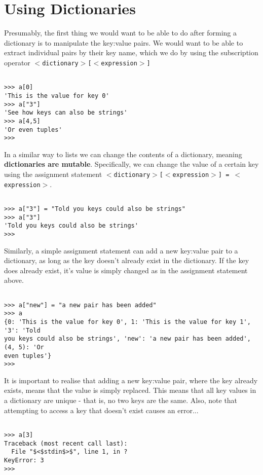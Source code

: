 \section{Using Dictionaries}

Presumably, the first thing we would want to be able to do after   forming a dictionary is to manipulate the key:value pairs. We would   want to be able to extract individual pairs by their key name, which we   do by using the subscription operator   
\texttt{$<$dictionary$>$[$<$expression$>$]}
\begin{lstlisting}

>>> a[0]
'This is the value for key 0'
>>> a["3"]
'See how keys can also be strings'
>>> a[4,5]
'Or even tuples'
>>>
\end{lstlisting}

In a similar way to lists we can change the contents of a   dictionary, meaning \textbf{dictionaries are mutable}.   Specifically, we can change the value of a certain key using the   assignment statement 
\texttt{$<$dictionary$>$[$<$expression$>$] =   $<$expression$>$}.
\begin{lstlisting}

>>> a["3"] = "Told you keys could also be strings"
>>> a["3"]
'Told you keys could also be strings'
>>>
\end{lstlisting}

Similarly, a simple assignment statement can add a new key:value   pair to a dictionary, as long as the key doesn't already exist in the   dictionary. If the key does already exist, it's value is simply changed   as in the assignment statement above.
\begin{lstlisting}

>>> a["new"] = "a new pair has been added"
>>> a
{0: 'This is the value for key 0', 1: 'This is the value for key 1', '3': 'Told
you keys could also be strings', 'new': 'a new pair has been added', (4, 5): 'Or
even tuples'}
>>>
\end{lstlisting}

It is important to realise that adding a new key:value pair, where the key already exists, means that the value is simply replaced. This means that all key values in a dictionary are unique - that is, no two keys are the same. Also, note   that attempting to access a key that doesn't exist causes an   error...
\begin{lstlisting}

>>> a[3]
Traceback (most recent call last):
  File "$<$stdin$>$", line 1, in ?
KeyError: 3
>>>
\end{lstlisting}

